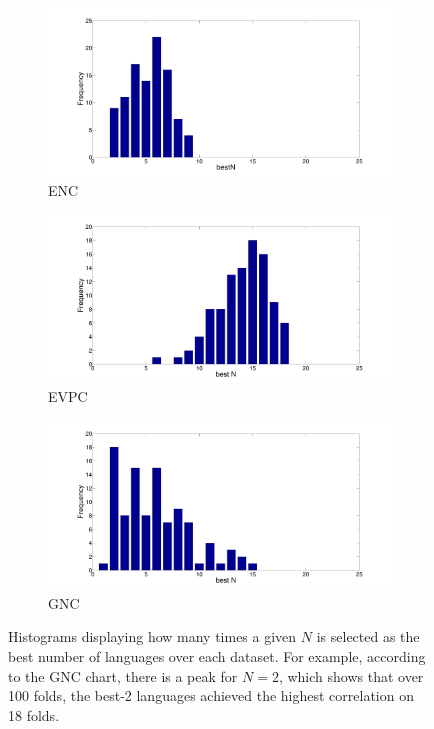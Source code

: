 \documentclass[output=paper,modfonts,nonflat]{langsci/langscibook}
\begin{document}
\begin{figure}[t]
        \centering
        \begin{subfigure}[b]{0.47\textwidth}
                \includegraphics[width=\textwidth]{figures/bestN.pdf}
                \caption{ENC}
                \label{fig:Nnc}
        \end{subfigure}%
        \begin{subfigure}[b]{0.47\textwidth}
                \includegraphics[width=\textwidth]{figures/bestNvpc.pdf}
                \caption{EVPC}
                \label{fig:Nvpc}
        \end{subfigure}          
        \begin{subfigure}[b]{0.47\textwidth}
                \includegraphics[width=\textwidth]{figures/bestNgnc.pdf}
                \caption{GNC}
                \label{fig:Ngnc}
        \end{subfigure}
        \caption{Histograms displaying how many times a given $N$ is
          selected as the best number of languages over each
          dataset. For example, according to the GNC chart, there is a
          peak for $N=2$, which shows that over 100 folds, the best-2
          languages achieved the highest correlation on 18
          folds.}\label{fig:bestN}
\end{figure}
\end{document}
